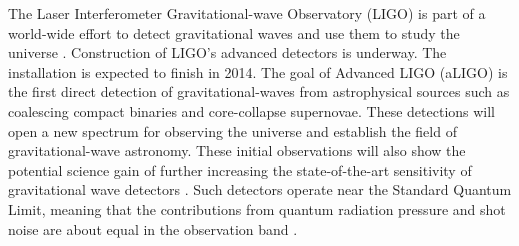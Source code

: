 \documentclass[%
 reprint,
 amsmath,amssymb,
 aps,
]{revtex4-1}
\begin{document}
The Laser Interferometer Gravitational-wave Observatory (LIGO) is part of a world-wide 
effort to detect gravitational waves and use them to study the universe \cite{BPAbbott09}. Construction of 
LIGO's advanced detectors is underway. The installation is expected to finish in 2014. The goal of Advanced LIGO (aLIGO) is the first direct detection of gravitational-waves 
from astrophysical sources such as coalescing compact binaries and core-collapse supernovae.
These detections will open a new spectrum for observing the universe and establish the field of 
gravitational-wave astronomy. 
These initial observations will also show the potential science gain of further increasing the state-of-the-art sensitivity of gravitational wave detectors \cite{Smith09,Harry10,Losurdo12}. Such detectors operate near the Standard Quantum Limit, meaning that the contributions from quantum radiation pressure and shot noise are about equal in the observation band \cite{Caves80, Ni86}.
\end{document}
